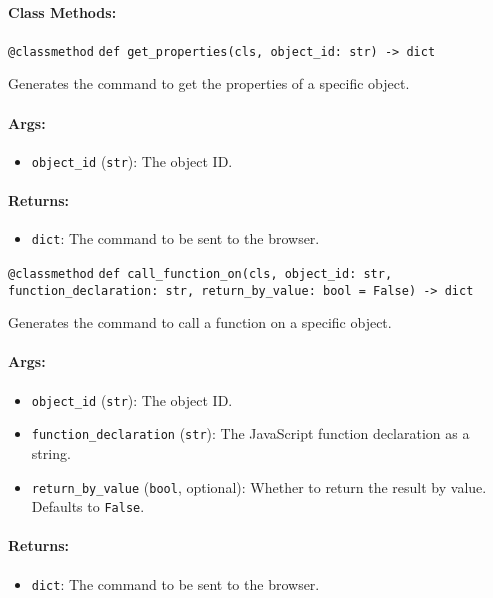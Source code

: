\documentclass{article}
\begin{document}
\paragraph{Class Methods:}
\noindent\texttt{@classmethod}
\noindent\texttt{def get\_properties(cls, object\_id: str) -> dict}

\noindent Generates the command to get the properties of a specific object.

\paragraph{Args:}
\begin{itemize}
    \item \texttt{object\_id} (\texttt{str}): The object ID.
\end{itemize}

\paragraph{Returns:}
\begin{itemize}
    \item \texttt{dict}: The command to be sent to the browser.
\end{itemize}

\noindent\texttt{@classmethod}
\noindent\texttt{def call\_function\_on(cls, object\_id: str, function\_declaration: str, return\_by\_value: bool = False) -> dict}

\noindent Generates the command to call a function on a specific object.

\paragraph{Args:}
\begin{itemize}
    \item \texttt{object\_id} (\texttt{str}): The object ID.
    \item \texttt{function\_declaration} (\texttt{str}): The JavaScript function declaration as a string.
    \item \texttt{return\_by\_value} (\texttt{bool}, optional): Whether to return the result by value. Defaults to \texttt{False}.
\end{itemize}

\paragraph{Returns:}
\begin{itemize}
    \item \texttt{dict}: The command to be sent to the browser.
\end{itemize}
\end{document}
